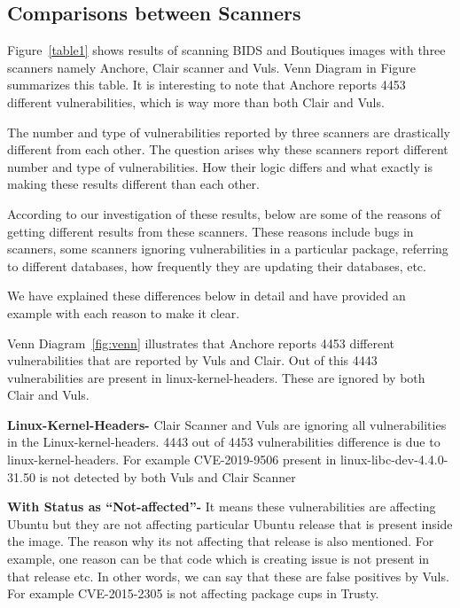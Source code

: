 \documentclass[a4paper,num-refs]{oup-contemporary}
\begin{document}
\subsection{Comparisons between Scanners}

Figure~\ref{table1} shows results of scanning BIDS and Boutiques images with three scanners namely Anchore,
Clair scanner and Vuls. Venn Diagram in Figure~\cite{fig:venn} summarizes this table. It is interesting to note that
Anchore reports 4453 different vulnerabilities, which is way more than both Clair and Vuls.

The number and type of vulnerabilities reported by three scanners are drastically different from each other.
The question arises why these scanners report different number and type of vulnerabilities.
How their logic differs and what exactly is making these results different than each other.

According to our investigation of these results, below are some of the reasons of
getting different results from these scanners. These reasons include bugs in scanners,
some scanners ignoring vulnerabilities in a particular package, referring to different databases,
how frequently they are updating their databases, etc. 

We have explained these differences below in detail
and have provided an example with each reason to make it clear.

Venn Diagram~\ref{fig:venn} illustrates that Anchore reports 4453 different vulnerabilities that are reported
by Vuls and Clair. Out of this 4443 vulnerabilities are present in linux-kernel-headers. These are ignored by
both Clair and Vuls.

\textbf{Linux-Kernel-Headers-} Clair Scanner and Vuls are ignoring all vulnerabilities in the Linux-kernel-headers.
4443 out of 4453 vulnerabilities difference is due to linux-kernel-headers.
For example CVE-2019-9506 present in linux-libc-dev-4.4.0-31.50 is not detected by both Vuls and Clair Scanner

\textbf{With Status as “Not-affected”-} It means these vulnerabilities are affecting Ubuntu but they are not 
affecting particular Ubuntu release that is present inside the image. The reason why its not affecting 
that release is also mentioned. For example, one reason can be that code which is creating issue is not 
present in that release etc. In other words, we can say that these are false positives by Vuls.
For example CVE-2015-2305 is not affecting package cups in Trusty.
\end{document}
